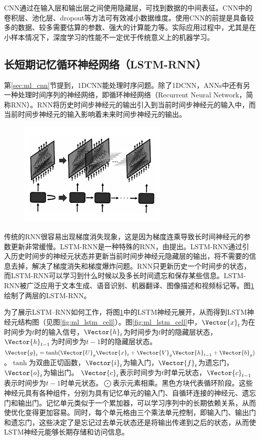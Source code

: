 CNN通过在输入层和输出层之间使用隐藏层，可找到数据的中间表征。CNN中的卷积层、池化层、dropout等方法可有效减小数据维度。使用CNN的前提是具备较多的数据、较多需要估算的参数、强大的计算能力等。实际应用过程中，尤其是在小样本情况下，深度学习的性能不一定优于传统意义上的机器学习。

\subsection{长短期记忆循环神经网络（LSTM-RNN）}\label{sec:ml_lstm}

第\ref{sec:ml_cnn}节提到，1DCNN能处理时序问题。除了1DCNN，ANNs中还有另一种处理时间序列的神经网络，即循环神经网络（Recurrent Neural Network，简称RNN）。RNN将历史时间步神经元的输出引入到当前时间步神经元的输入中，而当前时间步神经元的输入影响着未来时间步神经元的输出。

\begin{figure}[!htbp]
  \centering
  \noindent\includegraphics[width=72mm]{Img/chap2_ml/lstm_rnn}
  \label{fig:ml_lstm_rnn}
\end{figure}

传统的RNN很容易出现梯度消失现象，这是因为梯度连乘导致长时间神经元的参数更新非常缓慢。LSTM-RNN是一种特殊的RNN，由\citet{hochreiter1997long}提出。LSTM-RNN通过引入历史时间步的神经元状态并更新当前时间步神经元隐藏层的输出，将不需要的信息去掉，解决了梯度消失和梯度爆炸问题。RNN只更新历史一个时间步的状态，而LSTM-RNN可以学习到什么时候以及多长时间遗忘和保存某些信息。LSTM-RNN被广泛应用于文本生成、语音识别、机器翻译、图像描述和视频标记等。图\ref{fig:ml_lstm_rnn}绘制了两层的LSTM-RNN。

为了展示LSTM–RNN如何工作，将图\ref{fig:ml_lstm_rnn}中的LSTM神经元展开，从而得到LSTM神经元结构图（见图\ref{fig:ml_lstm_cell}）。图\ref{fig:ml_lstm_cell}中，$\Vector{x}_t$为在时间步为$t$时的输入信号，$\Vector{h}_{t}$为时间步为$t$时的隐藏层状态，$\Vector{h}_{t-1}$为时间步为$t-1$时的隐藏层状态。$\Vector{g}_t=\tanh(\Vector{U}_g\Vector{x}_t+\Vector{V}_g\Vector{h}_{t-1}+\Vector{b}_g)$。$\tanh$为双曲正切函数，$\Vector{i}_t$为输入门，$\Vector{f}_t$为遗忘门，$\Vector{o}_t$为输出门。 $\Vector{c}_t$表示时间步为$t$时单元状态，$\Vector{c}_{t-1}$ 表示时间步为$t-1$时单元状态。$\bigodot$表示元素相乘。黑色方块代表循环阶段。这些神经元具有各种组件，分别为具有记忆单元的输入门、自循环连接的神经元、遗忘门和输出门。记忆单元类似于一个累加器，可以学习序列中的长期依赖关系，从而使优化变得更加容易。同时，每个单元格由三个乘法单元控制，即输入门、输出门和遗忘门，这些决定了是忘记过去单元状态还是将输出传递到之后的状态，从而使LSTM神经元能够长期存储和访问信息。

